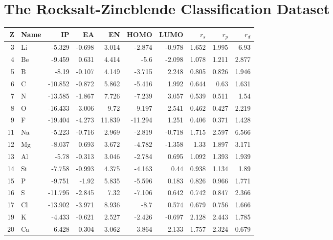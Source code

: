 \documentclass[11pt,oneside,czech,american]{book} %
\theoremstyle{plain}
\theoremstyle{definition}
\begin{document}
\chapter{The Rocksalt-Zincblende Classification Dataset}
\begin{table}[H]
	\begin{tabular}{rlrrrrrrrr}
		\hline
		Z & Name   &      IP &     EA &     EN &    HOMO &   LUMO &   $r_s$ &   $r_p$ &   $r_d$ \\
		\hline
		3 & Li     &  -5.329 & -0.698 &  3.014 &  -2.874 & -0.978 & 1.652 & 1.995 & 6.93  \\
		4 & Be     &  -9.459 &  0.631 &  4.414 &  -5.6   & -2.098 & 1.078 & 1.211 & 2.877 \\
		5 & B      &  -8.19  & -0.107 &  4.149 &  -3.715 &  2.248 & 0.805 & 0.826 & 1.946 \\
		6 & C      & -10.852 & -0.872 &  5.862 &  -5.416 &  1.992 & 0.644 & 0.63  & 1.631 \\
		7 & N      & -13.585 & -1.867 &  7.726 &  -7.239 &  3.057 & 0.539 & 0.511 & 1.54  \\
		8 & O      & -16.433 & -3.006 &  9.72  &  -9.197 &  2.541 & 0.462 & 0.427 & 2.219 \\
		9 & F      & -19.404 & -4.273 & 11.839 & -11.294 &  1.251 & 0.406 & 0.371 & 1.428 \\
		11 & Na     &  -5.223 & -0.716 &  2.969 &  -2.819 & -0.718 & 1.715 & 2.597 & 6.566 \\
		12 & Mg     &  -8.037 &  0.693 &  3.672 &  -4.782 & -1.358 & 1.33  & 1.897 & 3.171 \\
		13 & Al     &  -5.78  & -0.313 &  3.046 &  -2.784 &  0.695 & 1.092 & 1.393 & 1.939 \\
		14 & Si     &  -7.758 & -0.993 &  4.375 &  -4.163 &  0.44  & 0.938 & 1.134 & 1.89  \\
		15 & P      &  -9.751 & -1.92  &  5.835 &  -5.596 &  0.183 & 0.826 & 0.966 & 1.771 \\
		16 & S      & -11.795 & -2.845 &  7.32  &  -7.106 &  0.642 & 0.742 & 0.847 & 2.366 \\
		17 & Cl     & -13.902 & -3.971 &  8.936 &  -8.7   &  0.574 & 0.679 & 0.756 & 1.666 \\
		19 & K      &  -4.433 & -0.621 &  2.527 &  -2.426 & -0.697 & 2.128 & 2.443 & 1.785 \\
		20 & Ca     &  -6.428 &  0.304 &  3.062 &  -3.864 & -2.133 & 1.757 & 2.324 & 0.679 \\

\end{tabular}
\end{table}
\end{document}
